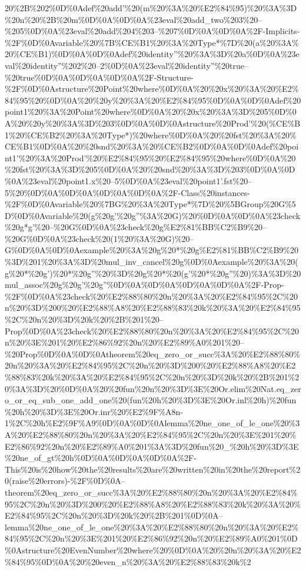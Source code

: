 20\%2B\%202\%0D\%0Adef\%20add'\%20(m\%20\%3A\%20\%E2\%84\%95)\%20\%3A\%3D\%20n\%20\%2B\%20m\%0D\%0A\%0D\%0A\%23eval\%20add_two\%203\%20--\%205\%0D\%0A\%23eval\%20add\%204\%203--\%207\%0D\%0A\%0D\%0A\%2F-Implicits-\%2F\%0D\%0Avariable\%20\%7B\%CE\%B1\%20\%3A\%20Type*\%7D\%20(a\%20\%3A\%20\%CE\%B1)\%0D\%0A\%0D\%0Adef\%20identity''\%20\%3A\%3D\%20a\%0D\%0A\%23eval\%20identity''\%202\%20--2\%0D\%0A\%23eval\%20identity''\%20true--\%20true\%0D\%0A\%0D\%0A\%0D\%0A\%2F-Structure-\%2F\%0D\%0Astructure\%20Point\%20where\%0D\%0A\%20\%20x\%20\%3A\%20\%E2\%84\%95\%20\%0D\%0A\%20\%20y\%20\%3A\%20\%E2\%84\%95\%0D\%0A\%0D\%0Adef\%20point1\%20\%3A\%20Point\%20where\%0D\%0A\%20\%20x\%20\%3A\%3D\%205\%0D\%0A\%20\%20y\%20\%3A\%3D\%203\%0D\%0A\%0D\%0Astructure\%20Prod'\%20(\%CE\%B1\%20\%CE\%B2\%20\%3A\%20Type*)\%20where\%0D\%0A\%20\%20fst\%20\%3A\%20\%CE\%B1\%0D\%0A\%20\%20snd\%20\%3A\%20\%CE\%B2\%0D\%0A\%0D\%0Adef\%20point1'\%20\%3A\%20Prod'\%20\%E2\%84\%95\%20\%E2\%84\%95\%20where\%0D\%0A\%20\%20fst\%20\%3A\%3D\%205\%0D\%0A\%20\%20snd\%20\%3A\%3D\%203\%0D\%0A\%0D\%0A\%23eval\%20point1.x\%20--5\%0D\%0A\%23eval\%20point1'.fst\%20--5\%20\%0D\%0A\%0D\%0A\%0D\%0A\%0D\%0A\%2F-Class\%20instances-\%2F\%0D\%0Avariable\%20\%7BG\%20\%3A\%20Type*\%7D\%20\%5BGroup\%20G\%5D\%0D\%0Avariable\%20(g\%20g'\%20g''\%3A\%20G)\%20\%0D\%0A\%0D\%0A\%23check\%20g*g'\%20--\%20G\%0D\%0A\%23check\%20g\%E2\%81\%BB\%C2\%B9\%20--\%20G\%0D\%0A\%23check\%20(1\%20\%3A\%20G)\%20--G\%0D\%0A\%0D\%0Aexample\%20\%3A\%20g\%20*\%20g\%E2\%81\%BB\%C2\%B9\%20\%3D\%201\%20\%3A\%3D\%20mul_inv_cancel\%20g\%0D\%0Aexample\%20\%3A\%20(g\%20*\%20g')\%20*\%20g''\%20\%3D\%20g\%20*\%20(g'\%20*\%20g''\%20)\%3A\%3D\%20mul_assoc\%20g\%20g'\%20g''\%0D\%0A\%0D\%0A\%0D\%0A\%0D\%0A\%2F-Prop-\%2F\%0D\%0A\%23check\%20\%E2\%88\%80\%20n\%20\%3A\%20\%E2\%84\%95\%2C\%20n\%20\%3D\%200\%20\%E2\%88\%A8\%20\%E2\%88\%83\%20k\%20\%3A\%20\%E2\%84\%95\%2C\%20n\%20\%3D\%20k\%20\%2B\%201\%20--Prop\%0D\%0A\%23check\%20\%E2\%88\%80\%20n\%20\%3A\%20\%E2\%84\%95\%2C\%20n\%20\%3E\%201\%20\%E2\%86\%92\%20n\%20\%E2\%89\%A0\%201\%20--\%20Prop\%0D\%0A\%0D\%0Atheorem\%20eq_zero_or_succ\%3A\%20\%E2\%88\%80\%20n\%20\%3A\%20\%E2\%84\%95\%2C\%20n\%20\%3D\%200\%20\%E2\%88\%A8\%20\%E2\%88\%83\%20k\%20\%3A\%20\%E2\%84\%95\%2C\%20n\%20\%3D\%20k\%20\%2B\%201\%20\%3A\%3D\%20\%0D\%0A\%20\%20fun\%20n\%20\%3D\%3E\%20Or.elim\%20Nat.eq_zero_or_eq_sub_one_add_one\%20(fun\%20h\%20\%3D\%3E\%20Or.inl\%20h)\%20fun\%20h\%20\%3D\%3E\%20Or.inr\%20\%E2\%9F\%A8n-1\%2C\%20h\%E2\%9F\%A9\%0D\%0A\%0D\%0Alemma\%20ne_one_of_le_one\%20\%3A\%20\%E2\%88\%80\%20n\%20\%3A\%20\%E2\%84\%95\%2C\%20n\%20\%3E\%201\%20\%E2\%86\%92\%20n\%20\%E2\%89\%A0\%201\%3A\%3D\%20fun\%20_\%20h\%20\%3D\%3E\%20ne_of_gt\%20h\%0D\%0A\%0D\%0A\%0D\%0A\%2F-This\%20is\%20how\%20the\%20results\%20are\%20written\%20in\%20the\%20report\%20(raise\%20errors)-\%2F\%0D\%0A--theorem\%20eq_zero_or_succ\%3A\%20\%E2\%88\%80\%20n\%20\%3A\%20\%E2\%84\%95\%2C\%20n\%20\%3D\%200\%20\%E2\%88\%A8\%20\%E2\%88\%83\%20k\%20\%3A\%20\%E2\%84\%95\%2C\%20n\%20\%3D\%20k\%20\%2B\%201\%0D\%0A--lemma\%20ne_one_of_le_one\%20\%3A\%20\%E2\%88\%80\%20n\%20\%3A\%20\%E2\%84\%95\%2C\%20n\%20\%3E\%201\%20\%E2\%86\%92\%20n\%20\%E2\%89\%A0\%201\%0D\%0Astructure\%20EvenNumber\%20where\%20\%0D\%0A\%20\%20n\%20\%3A\%20\%E2\%84\%95\%0D\%0A\%20\%20even_n\%20\%3A\%20\%E2\%88\%83\%20k\%2